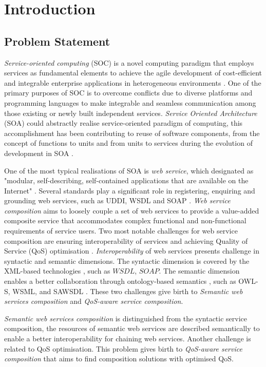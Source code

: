 \chapter{Introduction}\label{C:intro}

\section{Problem Statement}
\textit{Service-oriented computing} (SOC) is a novel computing paradigm that employs services as fundamental elements to achieve the agile development of cost-efficient and integrable enterprise applications in heterogeneous environments \cite{papazoglou2003service, papazoglou2006p}. One of the primary purposes of SOC is to overcome conflicts due to diverse platforms and programming languages to make integrable and seamless communication among those existing or newly built independent services. \textit{Service Oriented Architecture} (SOA)  could abstractly realise service-oriented paradigm of computing, this accomplishment has been contributing to reuse of software components, from the concept of functions to units and from units to services during the evolution of development in SOA \cite{booth2004web, overdick2007resource}. 

One of the most typical realisations of SOA is \textit{web service}, which designated as "modular, self-describing, self-contained applications that are available on the Internet" \cite{curbera2001web}. Several standards play a significant role in registering, enquiring and grounding web services, such as UDDI, WSDL and SOAP \cite{fensel2011semantic}. \textit{Web service composition} aims to loosely couple a set of web services to provide a value-added composite service that accommodates complex functional and non-functional requirements of service users. Two most notable challenges for web service composition are ensuring interoperability of services and achieving Quality of Service (QoS) optimisation \cite{fensel2011semantic}. \textit{Interoperability} of web services presents challenge in syntactic and semantic dimensions. The syntactic dimension is covered by the XML-based technologies \cite{yu2008deploying}, such as $WSDL$, $SOAP$. The semantic dimension enables a better collaboration through ontology-based semantics \cite{o2005review}, such as OWL-S, WSML, and SAWSDL \cite{petrie2016web}. These two challenges give birth to \textit{Semantic web services composition} and \textit{QoS-aware service composition}.


\textit{Semantic web services composition} is distinguished from the syntactic service composition, the resources of semantic web services are described semantically to enable a better interoperability for chaining web services. Another challenge is related to QoS optimisation. This problem gives birth to \textit{QoS-aware service composition} that aims to find composition solutions with optimised QoS.

